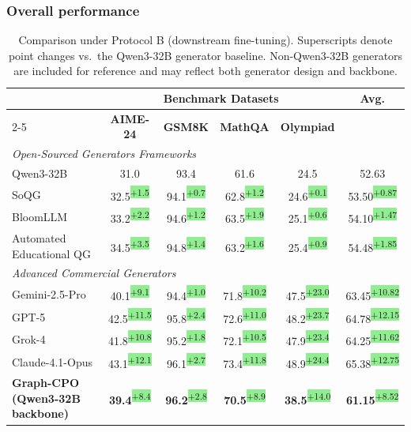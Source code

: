 \documentclass[sigconf, anonymous, review, screen]{acmart}
\newcommand{\ourmethod}{{Graph-CPO}}
\newcommand{\improve}[1]{\textsuperscript{\colorbox{lightgreen}{\textcolor{textgreen}{\tiny +#1}}}}
\begin{document}
\subsubsection{\textbf{Overall performance}}

\begin{table}[t]
\centering
\footnotesize
\caption{Comparison under Protocol B (downstream fine-tuning). Superscripts denote point changes vs.\ the Qwen3-32B generator baseline. Non-Qwen3-32B generators are included for reference and may reflect both generator design and backbone.}
\label{tab:benchmark-comparison-detailed}

\begin{tabular*}{\textwidth}{@{\extracolsep{\fill}}lccccc}
\toprule
 & \multicolumn{4}{c}{\textbf{Benchmark Datasets}} & \textbf{Avg.} \\
\cmidrule(lr){2-5}
 & \textbf{AIME-24} & \textbf{GSM8K} & \textbf{MathQA} & \textbf{Olympiad} & \\

\midrule
\multicolumn{6}{l}{\textit{Open-Sourced Generators Frameworks}} \\
Qwen3-32B & 31.0 & 93.4 & 61.6 & 24.5 & 52.63 \\
SoQG & 32.5\improve{1.5} & 94.1\improve{0.7} & 62.8\improve{1.2} & 24.6\improve{0.1} & 53.50\improve{0.87} \\
BloomLLM & 33.2\improve{2.2} & 94.6\improve{1.2} & 63.5\improve{1.9} & 25.1\improve{0.6} & 54.10\improve{1.47} \\
Automated Educational QG & 34.5\improve{3.5} & 94.8\improve{1.4} & 63.2\improve{1.6} & 25.4\improve{0.9} & 54.48\improve{1.85} \\
\midrule
\multicolumn{6}{l}{\textit{Advanced Commercial Generators}} \\
Gemini-2.5-Pro & 40.1\improve{9.1} & 94.4\improve{1.0} & 71.8\improve{10.2} & 47.5\improve{23.0} & 63.45\improve{10.82} \\
GPT-5 & 42.5\improve{11.5} & 95.8\improve{2.4} & 72.6\improve{11.0} & 48.2\improve{23.7} & 64.78\improve{12.15} \\
Grok-4 & 41.8\improve{10.8} & 95.2\improve{1.8} & 72.1\improve{10.5} & 47.9\improve{23.4} & 64.25\improve{11.62} \\
Claude-4.1-Opus & 43.1\improve{12.1} & 96.1\improve{2.7} & 73.4\improve{11.8} & 48.9\improve{24.4} & 65.38\improve{12.75} \\
\midrule
\textbf{\ourmethod{} (Qwen3-32B backbone)} & \textbf{39.4}\improve{8.4} & \textbf{96.2}\improve{2.8} & \textbf{70.5}\improve{8.9} & \textbf{38.5}\improve{14.0} & \textbf{61.15}\improve{8.52} \\
\bottomrule
\end{tabular*}
\end{table}
\end{document}
